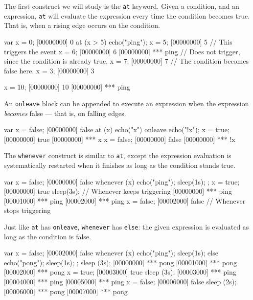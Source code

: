 The first construct we will study is the \lstinline|at| keyword. Given
a condition, and an expression, \lstinline|at| will evaluate the
expression every time the condition becomes true. That is,
when a rising edge occurs on the condition.

\begin{urbiscript}
var x = 0;
[00000000] 0
at (x > 5)
  echo("ping");
x = 5;
[00000000] 5
// This triggers the event
x = 6;
[00000000] 6
[00000000] *** ping
// Does not trigger, since the condition is already true.
x = 7;
[00000000] 7
// The condition becomes false here.
x = 3;
[00000000] 3

x = 10;
[00000000] 10
[00000000] *** ping
\end{urbiscript}

An \lstinline|onleave| block can be appended to execute an expression
when the expression \emph{becomes} false --- that is, on falling edges.

\begin{urbiscript}
var x = false;
[00000000] false
at (x)
  echo("x")
onleave
  echo("!x");
x = true;
[00000000] true
[00000000] *** x
x = false;
[00000000] false
[00000000] *** !x
\end{urbiscript}

The \lstinline|whenever| construct is similar to \lstinline|at|,
except the expression evaluation is systematically restarted when it
finishes as long as the condition stands true.

\begin{urbiscript}
var x = false;
[00000000] false
whenever (x)
{
  echo("ping");
  sleep(1s);
};
x = true;
[00000000] true
sleep(3s);
// Whenever keeps triggering
[00000000] *** ping
[00001000] *** ping
[00002000] *** ping
x = false;
[00002000] false
// Whenever stops triggering
\end{urbiscript}

Just like \lstinline|at| has \lstinline|onleave|, \lstinline|whenever|
has \lstinline|else|: the given expression is evaluated as long as the
condition is false.

\begin{urbiscript}
var x = false;
[00002000] false
whenever (x)
{
  echo("ping");
  sleep(1s);
}
else
{
  echo("pong");
  sleep(1s);
};
sleep (3s);
[00000000] *** pong
[00001000] *** pong
[00002000] *** pong
x = true;
[00003000] true
sleep (3s);
[00003000] *** ping
[00004000] *** ping
[00005000] *** ping
x = false;
[00006000] false
sleep (2s);
[00006000] *** pong
[00007000] *** pong
\end{urbiscript}

